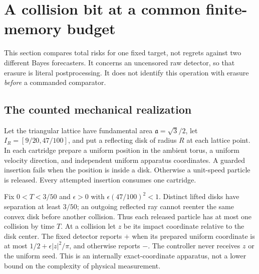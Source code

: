 \documentclass[11pt]{amsart}
\theoremstyle{definition}\newtheorem{definition}[theorem]{Definition}
\theoremstyle{remark}\newtheorem{remark}[theorem]{Remark}
\begin{document}
\section{A collision bit at a common finite-memory budget}\label{sec:common-risk}
This section compares total risks for one fixed target, not regrets against
two different Bayes forecasters. It concerns an uncensored raw detector,
so that erasure is literal postprocessing. It does not identify this operation
with erasure \emph{before} a commanded comparator.

\subsection{The counted mechanical realization}
Let the triangular lattice have fundamental area
$\mathfrak a=\sqrt3/2$, let $I_R=[9/20,47/100]$, and put a reflecting
disk of radius $R$ at each lattice point. In each cartridge prepare a
uniform position in the ambient torus, a uniform velocity direction,
and independent uniform apparatus coordinates. A guarded insertion fails
when the position is inside a disk. Otherwise a unit-speed particle is
released. Every attempted insertion consumes one cartridge.

Fix $0<T<3/50$ and $\epsilon>0$ with
$\epsilon(47/100)^2<1$. Distinct lifted disks have separation at least
$3/50$; an outgoing reflected ray cannot reenter the same convex disk
before another collision. Thus each released particle has at most one
collision by time $T$. At a collision let $z$ be its impact coordinate
relative to the disk center. The fixed detector reports $+$ when its
prepared uniform coordinate is at most
$1/2+\epsilon|z|^2/\pi$, and otherwise reports $-$. The controller
never receives $z$ or the uniform seed. This is an internally exact-coordinate
apparatus, not a lower bound on the complexity of physical measurement.
\end{document}
